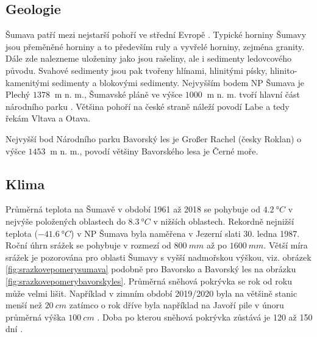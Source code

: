 \subsection{Geologie}
Šumava patří mezi nejstarší pohoří ve střední Evropě \parencite{WildJan2004Cops}. Typické horniny Šumavy jsou přeměněné horniny a to především ruly a vyvřelé horniny, zejména granity. Dále zde nalezneme uloženiny jako jsou rašeliny, ale i sedimenty ledovcového původu. Svahové sedimenty jsou pak tvořeny hlínami, hlinitými písky, hlinito-kamenitými sedimenty a blokovými sedimenty. Nejvyšším bodem NP Šumava je Plechý $\SI{1378}{}$ m n. m., Šumavské pláně ve výšce $\SI{1000}{}$ m n. m. tvoří hlavní část národního parku \parencite{npsumava}. Většina pohoří na české straně náleží povodí Labe a tedy řekám Vltava a Otava.

Nejvyšší bod Národního parku Bavorský les je Großer Rachel (česky Roklan) o výšce $\SI{1453}{}$ m n. m., povodí většiny Bavorského lesa je Černé moře.

\subsection{Klima}
Průměrná teplota na Šumavě v období 1961 až 2018 se pohybuje od $\SI{4.2}{\degree C}$ v nejvýše položených oblastech do $\SI{8.3}{\degree C}$ v nižších oblastech. Rekordně nejnižší teplota ($\SI{-41.6}{\degree C}$) v NP Šumava byla naměřena v Jezerní slati 30. ledna 1987. Roční úhrn srážek se pohybuje v rozmezí od $\SI{800}{mm}$ až po $\SI{1600}{mm}$. Větší míra srážek je pozorována pro oblasti Šumavy s vyšší nadmořskou výškou, viz. obrázek \ref{fig:srazkovepomerysumava} podobně pro Bavorsko a Bavorský les na obrázku \ref{fig:srazkovepomerybavorskyles}. Průměrná sněhová pokrývka se rok od roku může velmi lišit. Například v zimním období 2019/2020 byla na většině stanic menší než $\SI{20}{cm}$ zatímco o rok dříve byla například na Javoří pile v únoru průměrná výška $\SI{100}{cm}$ \parencite{meansnowsumava}. Doba po kterou sněhová pokrývka zůstává je 120 až 150 dní \parencite{npsumava}.

